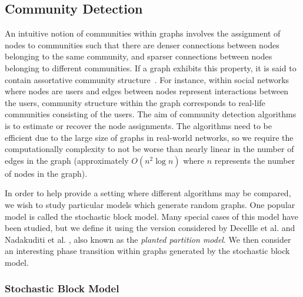 \documentclass[12pt]{article}
\numberwithin{equation}{section}
\begin{document}
\subsection{Community Detection}
\label{sec:background;subsec:communityDetection}

An intuitive notion of communities within graphs involves the assignment of nodes to communities such that there are denser connections between nodes belonging to the same community, and sparser connections between nodes belonging to different communities. If a graph exhibits this property, it is said to contain assortative community structure~\cite{New06a,DKM+13,For10,New06b}. For instance, within social networks where nodes are users and edges between nodes represent interactions between the users, community structure within the graph corresponds to real-life communities consisting of the users. The aim of community detection algorithms is to estimate or recover the node assignments. The algorithms need to be efficient due to the large size of graphs in real-world networks, so we require the computationally complexity to not be worse than nearly linear in the number of edges in the graph (approximately $O(n^{2}\log n)$ where $n$ represents the number of nodes in the graph).

In order to help provide a setting where different algorithms may be compared, we wish to study particular models which generate random graphs. One popular model is called the stochastic block model. Many special cases of this model have been studied, but we define it using the version considered by Decellle et al. \cite{DKM+13} and Nadakuditi et al. \cite{NN12}, also known as the \textit{planted partition model}. We then consider an interesting phase transition within graphs generated by the stochastic block model.

\subsubsection{Stochastic Block Model}
\label{sec:background;subsec:communityDetection;subsubsec:stochasticBlockModel}
\end{document}
